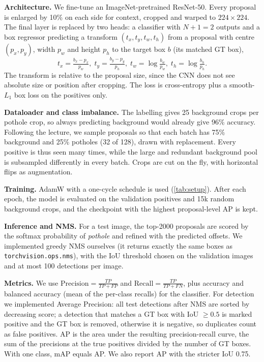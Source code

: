 \documentclass[10pt,twocolumn,letterpaper]{article}
\begin{document}
\noindent\textbf{Architecture.}
We fine-tune an ImageNet-pretrained ResNet-50. Every proposal is enlarged by 10\% on each side for context, cropped and warped to $224\times224$. The final layer is replaced by two heads: a classifier with $N{+}1=2$ outputs and a box regressor predicting a transform $(t_x,t_y,t_w,t_h)$ from a proposal with centre $(p_x,p_y)$, width $p_w$ and height $p_h$ to the target box $b$ (its matched GT box),
\begin{equation*}
t_x=\tfrac{b_x-p_x}{p_w},\; t_y=\tfrac{b_y-p_y}{p_h},\; t_w=\log\tfrac{b_w}{p_w},\; t_h=\log\tfrac{b_h}{p_h}.
\end{equation*}
The transform is relative to the proposal size, since the CNN does not see absolute size or position after cropping. The loss is cross-entropy plus a smooth-$L_1$ box loss on the positives only.

\noindent\textbf{Dataloader and class imbalance.}
The labelling gives 25 background crops per pothole crop, so always predicting background would already give 96\% accuracy. Following the lecture, we sample proposals so that each batch has 75\% background and 25\% potholes (32 of 128), drawn with replacement. Every positive is thus seen many times, while the large and redundant background pool is subsampled differently in every batch. Crops are cut on the fly, with horizontal flips as augmentation.

\noindent\textbf{Training.}
AdamW with a one-cycle schedule is used (\cref{tab:setup}). After each epoch, the model is evaluated on the validation positives and 15k random background crops, and the checkpoint with the highest proposal-level AP is kept.

\noindent\textbf{Inference and NMS.}
For a test image, the top-2000 proposals are scored by the softmax probability of \emph{pothole} and refined with the predicted offsets. We implemented greedy NMS ourselves (it returns exactly the same boxes as \texttt{torchvision.ops.nms}), with the IoU threshold chosen on the validation images and at most 100 detections per image.

\noindent\textbf{Metrics.}
We use $\text{Precision}=\frac{TP}{TP+FP}$ and $\text{Recall}=\frac{TP}{TP+FN}$, plus accuracy and balanced accuracy (mean of the per-class recalls) for the classifier. For detection we implemented Average Precision: all test detections after NMS are sorted by decreasing score; a detection that matches a GT box with IoU $\ge 0.5$ is marked positive and the GT box is removed, otherwise it is negative, so duplicates count as false positives. AP is the area under the resulting precision-recall curve, \ie the sum of the precisions at the true positives divided by the number of GT boxes. With one class, mAP equals AP. We also report AP with the stricter IoU 0.75.
\end{document}
